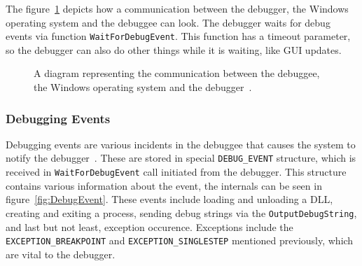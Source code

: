 The figure~\ref{fig:win32debugger} depicts how a communication between the
debugger, the Windows operating system and the debuggee can look. The debugger
waits for debug events via function \texttt{WaitForDebugEvent}. This
function has a timeout parameter, so the debugger can also do other things
while it is waiting, like GUI updates.

\begin{figure}
    \centering
    \caption{A diagram representing the communication between the debuggee, the
    Windows operating system and the debugger~\cite{windows-dbg-api-rev}.}
    \label{fig:win32debugger}
\end{figure}
 
\subsubsection*{Debugging Events}\label{section:Debug Events}
Debugging events are various incidents in the debuggee that causes the system
to notify the debugger~\cite{windows-msdn-debug-events}. These are stored in
special \texttt{DEBUG_EVENT} structure, which is received in
\texttt{WaitForDebugEvent} call initiated from the debugger. This
structure contains various information about the event, the internals can be
seen in figure~\ref{fig:DebugEvent}. These events include loading and unloading
a DLL, creating and exiting a process, sending debug strings via the
\texttt{OutputDebugString}, and last but not least, exception occurence.
Exceptions include the \verb|EXCEPTION_BREAKPOINT| and
\verb|EXCEPTION_SINGLESTEP| mentioned previously, which are vital to the
debugger.

